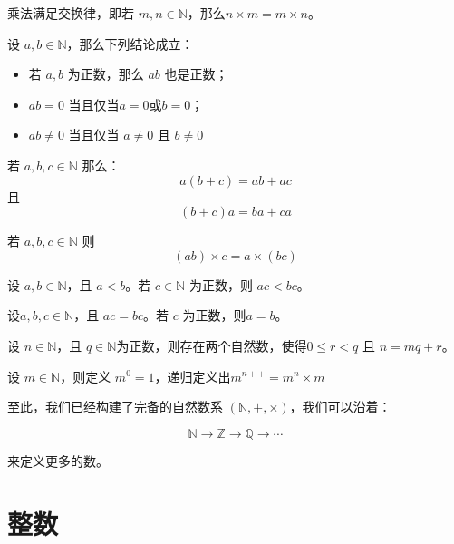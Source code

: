 \begin{theorem}[交换律]
	乘法满足交换律，即若 $m,n\in \mathbb N$，那么$n\times m = m\times n$。
\end{theorem}


\begin{theorem}[乘法的其他性质]
	设 $a,b\in \mathbb N$，那么下列结论成立：
	\begin{itemize}
		\item 若 $a,b$ 为正数，那么 $ab$ 也是正数；
		\item $ab=0$ 当且仅当$a=0$或$b=0$；
		\item $ab\ne 0$ 当且仅当 $a\ne 0$ 且 $b\ne 0$
	\end{itemize}
\end{theorem}

\begin{theorem}[分配律]
	若 $a,b,c\in \mathbb N$ 那么：
	$$
	a(b+c) = ab+ac
	$$
	\noindent 且
	$$
	(b+c)a = ba+ca
	$$
\end{theorem}

\begin{theorem}[结合律]
	若 $a,b,c\in\mathbb N$ 则
	$$
	(ab)\times c = a\times (bc)
	$$
\end{theorem}


\begin{theorem}[保序性]
	设 $a,b\in \mathbb N$，且 $a<b$。若 $c\in \mathbb N$ 为正数，则 $ac<bc$。
\end{theorem}

\begin{theorem}[消去律]
	设$a,b,c\in \mathbb N$，且 $ac=bc$。若 $c$ 为正数，则$a=b$。
\end{theorem}

\begin{theorem}[欧几里得算法]
	设 $n\in \mathbb N$，且 $q\in \mathbb N$为正数，则存在两个自然数，使得$0\le r < q$ 且 $n=mq+r$。
\end{theorem}


\begin{definition}[幂]
	设 $m\in \mathbb N$，则定义 $m^0=1$，递归定义出$m^{n++}=m^n\times m$
\end{definition}


至此，我们已经构建了完备的自然数系 $(\mathbb N, +, \times)$，我们可以沿着：

$$
\mathbb N\rightarrow \mathbb Z\rightarrow \mathbb Q\rightarrow \cdots
$$

\noindent 来定义更多的数。

\section{整数}

